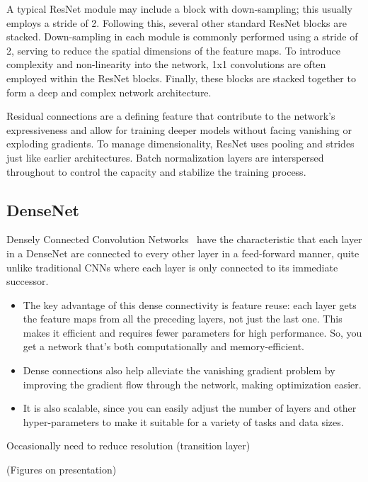 \documentclass[11pt]{article}
\begin{document}
A typical ResNet module may include a block with down-sampling; this usually employs a stride of 2. Following this, several other standard ResNet blocks are stacked. Down-sampling in each module is commonly performed using a stride of 2, serving to reduce the spatial dimensions of the feature maps. To introduce complexity and non-linearity into the network, 1x1 convolutions are often employed within the ResNet blocks. Finally, these blocks are stacked together to form a deep and complex network architecture.

Residual connections are a defining feature that contribute to the network's expressiveness and allow for training deeper models without facing vanishing or exploding gradients. To manage dimensionality, ResNet uses pooling and strides just like earlier architectures. Batch normalization layers are interspersed throughout to control the capacity and stabilize the training process.

\subsection{DenseNet}

Densely Connected Convolution Networks~\cite{DenseNet} have the characteristic that each layer in a DenseNet are connected to every other layer in a feed-forward manner, quite unlike traditional CNNs where each layer is only connected to its immediate successor.

\begin{itemize}
    \item The key advantage of this dense connectivity is feature reuse: each layer gets the feature maps from all the preceding layers, not just the last one. This makes it efficient and requires fewer parameters for high performance. So, you get a network that's both computationally and memory-efficient.

    \item Dense connections also help alleviate the vanishing gradient problem by improving the gradient flow through the network, making optimization easier.
    
    \item It is also scalable, since you can easily adjust the number of layers and other hyper-parameters to make it suitable for a variety of tasks and data sizes.
\end{itemize}

Occasionally need to reduce resolution (transition layer)

(Figures on presentation)
\end{document}

